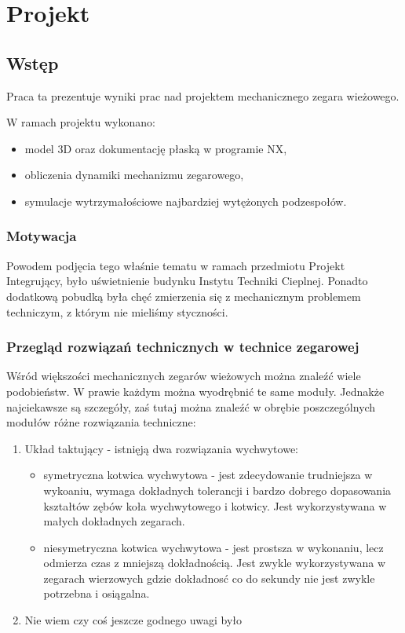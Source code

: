 \chapter{Projekt}
    \section{Wstęp}
    Praca ta prezentuje wyniki prac nad projektem mechanicznego zegara wieżowego.
    
    W ramach projektu wykonano:
   \begin{itemize}
   	\item model 3D oraz dokumentację płaską w programie NX,
   	\item obliczenia dynamiki mechanizmu zegarowego,
   	\item symulacje wytrzymałościowe najbardziej wytężonych podzespołów.
   \end{itemize}
	
	
        \subsection{Motywacja}
        Powodem podjęcia tego właśnie tematu w ramach przedmiotu Projekt Integrujący, było uświetnienie budynku Instytu Techniki Cieplnej.
        Ponadto dodatkową pobudką była chęć zmierzenia się z mechanicznym problemem techniczym, z którym nie mieliśmy styczności.
        \subsection{Przegląd rozwiązań technicznych w technice zegarowej}
        Wśród większości mechanicznych zegarów wieżowych można znaleźć wiele podobieństw.
        W prawie każdym można wyodrębnić te same moduły.
        Jednakże najciekawsze są szczegóły, zaś tutaj można znaleźć w obrębie poszczególnych modułów różne rozwiązania techniczne:
        \begin{enumerate}
        	\item Układ taktujący - istnięją dwa rozwiązania wychwytowe:
        	\begin{itemize}
        		\item symetryczna kotwica wychwytowa - jest zdecydowanie trudniejsza w wykoaniu, wymaga dokładnych tolerancji i bardzo dobrego dopasowania kształtów zębów koła wychwytowego i kotwicy. Jest wykorzystywana w małych dokładnych zegarach.
        		\item niesymetryczna kotwica wychwytowa - jest prostsza w wykonaniu, lecz odmierza czas z mniejszą dokładnością. Jest zwykle wykorzystywana w zegarach wierzowych gdzie dokładnosć co do sekundy nie jest zwykle potrzebna i osiągalna.
        	\end{itemize}
        \item Nie wiem czy coś jeszcze godnego uwagi było
       	\end{enumerate}	

